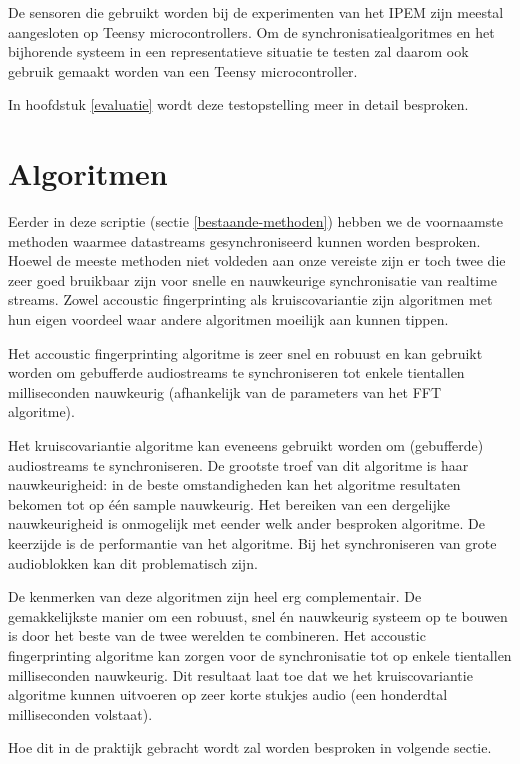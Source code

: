 De sensoren die gebruikt worden bij de experimenten van het IPEM zijn meestal aangesloten op Teensy microcontrollers.
Om de synchronisatiealgoritmes en het bijhorende systeem in een representatieve situatie te testen zal daarom ook gebruik gemaakt worden van een Teensy microcontroller.

In hoofdstuk \ref{evaluatie} wordt deze testopstelling meer in detail besproken.

\section{Algoritmen}

Eerder in deze scriptie (sectie \ref{bestaande-methoden}) hebben we de voornaamste methoden waarmee datastreams gesynchroniseerd kunnen worden besproken. Hoewel de meeste methoden niet voldeden aan onze vereiste zijn er toch twee die zeer goed bruikbaar zijn voor snelle en nauwkeurige synchronisatie van realtime streams. Zowel accoustic fingerprinting als kruiscovariantie zijn algoritmen met hun eigen voordeel waar andere algoritmen moeilijk aan kunnen tippen.

Het accoustic fingerprinting algoritme is zeer snel en robuust en kan gebruikt worden om gebufferde audiostreams te synchroniseren tot enkele tientallen milliseconden nauwkeurig (afhankelijk van de parameters van het FFT algoritme).

Het kruiscovariantie algoritme kan eveneens gebruikt worden om (gebufferde) audiostreams te synchroniseren. De grootste troef van dit algoritme is haar nauwkeurigheid: in de beste omstandigheden kan het algoritme resultaten bekomen tot op één sample nauwkeurig. Het bereiken van een dergelijke nauwkeurigheid is onmogelijk met eender welk ander besproken algoritme. De keerzijde is de performantie van het algoritme. Bij het synchroniseren van grote audioblokken kan dit problematisch zijn.

De kenmerken van deze algoritmen zijn heel erg complementair. De gemakkelijkste manier om een robuust, snel én nauwkeurig systeem op te bouwen is door het beste van de twee werelden te combineren. Het accoustic fingerprinting algoritme kan zorgen voor de synchronisatie tot op enkele tientallen milliseconden nauwkeurig. Dit resultaat laat toe dat we het kruiscovariantie algoritme kunnen uitvoeren op zeer korte stukjes audio (een honderdtal milliseconden volstaat).

Hoe dit in de praktijk gebracht wordt zal worden besproken in volgende sectie.

